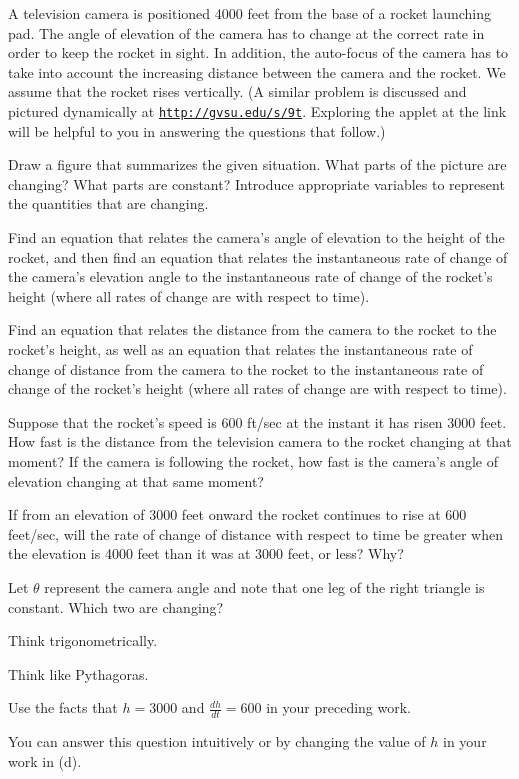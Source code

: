 \begin{activity} \label{A:3.5.2}  A television camera is positioned 4000 feet from the base of a rocket launching pad.  The angle of elevation of the camera has to change at the correct rate in order to keep the rocket in sight.  In addition, the auto-focus of the camera has to take into account the increasing distance between the camera and the rocket.  We assume that the rocket rises vertically.  (A similar problem is discussed and pictured dynamically at \href{http://gvsu.edu/s/9t}{\texttt{http://gvsu.edu/s/9t}}.  Exploring the applet at the link will be helpful to you in answering the questions that follow.)
\ba
	\item Draw a figure that summarizes the given situation.  What parts of the picture are changing?  What parts are constant?  Introduce appropriate variables to represent the quantities that are changing.
	\item Find an equation that relates the camera's angle of elevation to the height of the rocket, and then find an equation that relates the instantaneous rate of change of the camera's elevation angle to the instantaneous rate of change of the rocket's height (where all rates of change are with respect to time).
	\item Find an equation that relates the distance from the camera to the rocket to the rocket's height, as well as an equation that relates the instantaneous rate of change of distance from the camera to the rocket to the instantaneous rate of change of the rocket's height (where all rates of change are with respect to time).
	\item Suppose that the rocket's speed is 600 ft/sec at the instant it has risen 3000 feet.  How fast is the distance from the television camera to the rocket changing at that moment?  If the camera is following the rocket, how fast is the camera's angle of elevation changing at that same moment?
	\item If from an elevation of 3000 feet onward the rocket continues to rise at 600 feet/sec, will the rate of change of distance with respect to time be greater when the elevation is 4000 feet than it was at 3000 feet, or less?  Why?  
\ea
\end{activity}
\begin{smallhint}
\ba
	\item Let $\theta$ represent the camera angle and note that one leg of the right triangle is constant.  Which two are changing?
	\item Think trigonometrically.
	\item Think like Pythagoras.
	\item Use the facts that $h = 3000$ and $\frac{dh}{dt} = 600$ in your preceding work.
	\item You can answer this question intuitively or by changing the value of $h$ in your work in (d).
\ea
\end{smallhint}
